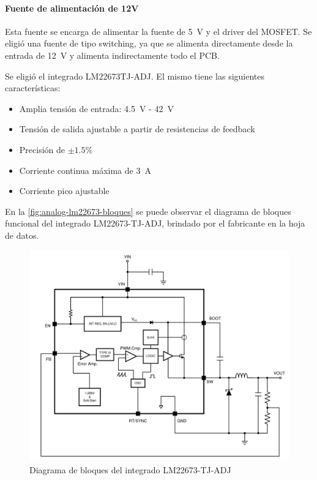 \documentclass[titlepage, 12pt]{article}
\begin{document}
\paragraph{Fuente de alimentación de 12V}
Esta fuente se encarga de alimentar la fuente de \SI{5}{V} y el driver del MOSFET. Se eligió una fuente de tipo switching, ya que se alimenta directamente desde la entrada de \SI{12}{V} y alimenta indirectamente todo el PCB.

Se eligió el integrado LM22673TJ-ADJ. El mismo tiene las siguientes características:
  \begin{itemize}
    \item Amplia tensión de entrada: \SI{4.5}{V} - \SI{42}{V}
    \item Tensión de salida ajustable a partir de resistencias de feedback
    \item Precisión de $\pm 1.5 \%$
    \item Corriente continua máxima de \SI{3}{A}
    \item Corriente pico ajustable
  \end{itemize}

En la \autoref{fig:analog-lm22673-bloques} se puede observar el diagrama de bloques funcional del integrado LM22673-TJ-ADJ, brindado por el fabricante en la hoja de datos.

  \begin{figure}[!htbp]
    \centering
    \includegraphics[scale=0.5]{images/analog-lm22673-bloques}
    \caption{Diagrama de bloques del integrado LM22673-TJ-ADJ}
    \label{fig:analog-lm22673-bloques}
  \end{figure}
\end{document}

